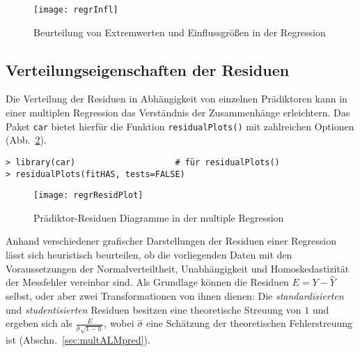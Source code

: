 \begin{figure}[ht]
\centering
\texttt{[image: regrInfl]}
\vspace*{-0.5em}
\caption{Beurteilung von Extremwerten und Einflussgrößen in der Regression}
\label{fig:regrInfl}
\end{figure}

\subsection{Verteilungseigenschaften der Residuen}
\label{sec:regrResid}

Die Verteilung der Residuen in Abhängigkeit von einzelnen Prädiktoren kann in einer multiplen Regression das Verständnis der Zusammenhänge erleichtern. Das Paket \lstinline!car! bietet hierfür die Funktion \lstinline!residualPlots()! mit zahlreichen Optionen (Abb.\ \ref{fig:regrResidPlot}).

\begin{lstlisting}
> library(car)                    # für residualPlots()
> residualPlots(fitHAS, tests=FALSE)
\end{lstlisting}

\begin{figure}[ht]
\centering
\texttt{[image: regrResidPlot]}
\vspace*{-0.5em}
\caption{Prädiktor-Residuen Diagramme in der multiple Regression}
\label{fig:regrResidPlot}
\end{figure}

Anhand verschiedener grafischer Darstellungen der Residuen einer Regression lässt sich heuristisch beurteilen, ob die vorliegenden Daten mit den Voraussetzungen der Normalverteiltheit, Unabhängigkeit und Homoskedastizität der Messfehler vereinbar sind. Als Grundlage können die Residuen $E = Y - \hat{Y}$ selbst, oder aber zwei Transformationen von ihnen dienen: Die \emph{standardisierten} und \emph{studentisierten} Residuen besitzen eine theoretische Streuung von $1$ und ergeben sich als $\frac{E}{\hat{\sigma} \sqrt{1-h}}$, wobei $\hat{\sigma}$ eine Schätzung der theoretischen Fehlerstreuung ist (Abschn.\ \ref{sec:multALMpred}).

